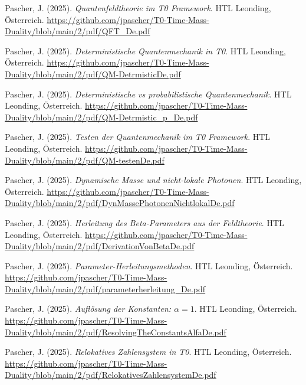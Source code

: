 \documentclass{article}
\begin{document}
\begin{thebibliography}{99}
		Pascher, J. (2025).
		\textit{Quantenfeldtheorie im T0 Framework}.
		HTL Leonding, Österreich.
		\url{https://github.com/jpascher/T0-Time-Mass-Duality/blob/main/2/pdf/QFT_De.pdf}
		
		Pascher, J. (2025).
		\textit{Deterministische Quantenmechanik in T0}.
		HTL Leonding, Österreich.
		\url{https://github.com/jpascher/T0-Time-Mass-Duality/blob/main/2/pdf/QM-DetrmisticDe.pdf}
		
		Pascher, J. (2025).
		\textit{Deterministische vs probabilistische Quantenmechanik}.
		HTL Leonding, Österreich.
		\url{https://github.com/jpascher/T0-Time-Mass-Duality/blob/main/2/pdf/QM-Detrmistic_p_De.pdf}
		
		Pascher, J. (2025).
		\textit{Testen der Quantenmechanik im T0 Framework}.
		HTL Leonding, Österreich.
		\url{https://github.com/jpascher/T0-Time-Mass-Duality/blob/main/2/pdf/QM-testenDe.pdf}
		
		Pascher, J. (2025).
		\textit{Dynamische Masse und nicht-lokale Photonen}.
		HTL Leonding, Österreich.
		\url{https://github.com/jpascher/T0-Time-Mass-Duality/blob/main/2/pdf/DynMassePhotonenNichtlokalDe.pdf}
		
		
		Pascher, J. (2025).
		\textit{Herleitung des Beta-Parameters aus der Feldtheorie}.
		HTL Leonding, Österreich.
		\url{https://github.com/jpascher/T0-Time-Mass-Duality/blob/main/2/pdf/DerivationVonBetaDe.pdf}
		
		Pascher, J. (2025).
		\textit{Parameter-Herleitungsmethoden}.
		HTL Leonding, Österreich.
		\url{https://github.com/jpascher/T0-Time-Mass-Duality/blob/main/2/pdf/parameterherleitung_De.pdf}
		
		Pascher, J. (2025).
		\textit{Auflösung der Konstanten: $\alpha = 1$}.
		HTL Leonding, Österreich.
		\url{https://github.com/jpascher/T0-Time-Mass-Duality/blob/main/2/pdf/ResolvingTheConstantsAlfaDe.pdf}
		
		Pascher, J. (2025).
		\textit{Relokatives Zahlensystem in T0}.
		HTL Leonding, Österreich.
		\url{https://github.com/jpascher/T0-Time-Mass-Duality/blob/main/2/pdf/RelokativesZahlensystemDe.pdf}
		

\end{thebibliography}
\end{document}
